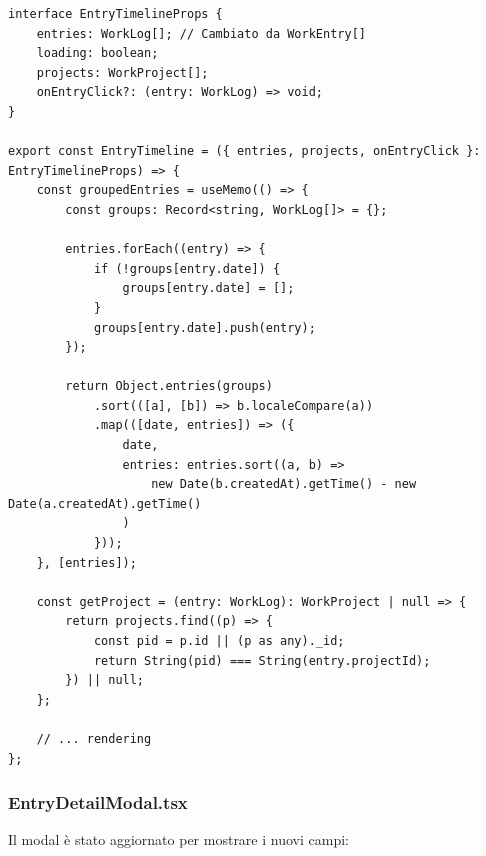 \documentclass[11pt,a4paper]{article}
\begin{document}
\begin{lstlisting}[caption=EntryTimeline Aggiornato]
interface EntryTimelineProps {
    entries: WorkLog[]; // Cambiato da WorkEntry[]
    loading: boolean;
    projects: WorkProject[];
    onEntryClick?: (entry: WorkLog) => void;
}

export const EntryTimeline = ({ entries, projects, onEntryClick }: EntryTimelineProps) => {
    const groupedEntries = useMemo(() => {
        const groups: Record<string, WorkLog[]> = {};
        
        entries.forEach((entry) => {
            if (!groups[entry.date]) {
                groups[entry.date] = [];
            }
            groups[entry.date].push(entry);
        });
        
        return Object.entries(groups)
            .sort(([a], [b]) => b.localeCompare(a))
            .map(([date, entries]) => ({ 
                date, 
                entries: entries.sort((a, b) => 
                    new Date(b.createdAt).getTime() - new Date(a.createdAt).getTime()
                )
            }));
    }, [entries]);
    
    const getProject = (entry: WorkLog): WorkProject | null => {
        return projects.find((p) => {
            const pid = p.id || (p as any)._id;
            return String(pid) === String(entry.projectId);
        }) || null;
    };
    
    // ... rendering
};
\end{lstlisting}

\subsubsection{EntryDetailModal.tsx}

Il modal è stato aggiornato per mostrare i nuovi campi:
\end{document}
